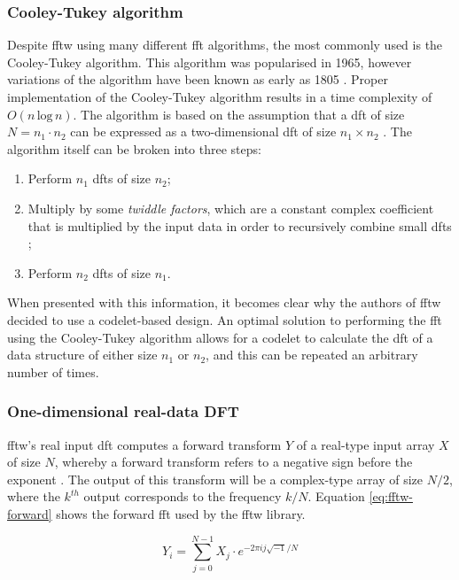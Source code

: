 \documentclass[a4paper,11pt]{report}
\begin{document}
\subsubsection{Cooley-Tukey algorithm}
Despite \gls{fftw} using many different \gls{fft} algorithms, the most commonly used is the Cooley-Tukey algorithm. This algorithm was popularised in 1965, however variations of the algorithm have been known as early as 1805 \cite{cooley1965algorithm, heideman1985gauss}. Proper implementation of the Cooley-Tukey algorithm results in a time complexity of $O(n\, \textrm{log}\, n)$. The algorithm is based on the assumption that a \gls{dft} of size $N = n_{1} \cdot n_{2}$ can be expressed as a two-dimensional \gls{dft} of size $n_{1} \times n_{2}$ \cite{frigo2005design}. The algorithm itself can be broken into three steps: 

\begin{enumerate}
	\item Perform $n_{1}$ \gls{dft}s of size $n_{2}$;
	\item Multiply by some \textit{twiddle factors}, which are a constant complex coefficient that is multiplied by the input data in order to recursively combine small \gls{dft}s \cite{gentleman1966fast};
	\item Perform $n_{2}$ \gls{dft}s of size $n_{1}$.
\end{enumerate}

When presented with this information, it becomes clear why the authors of \gls{fftw} decided to use a codelet-based design. An optimal solution to performing the \gls{fft} using the Cooley-Tukey algorithm allows for a codelet to calculate the \gls{dft} of a data structure of either size $n_{1}$ or $n_{2}$, and this can be repeated an arbitrary number of times.

\subsubsection{One-dimensional real-data DFT}
\gls{fftw}'s real input \gls{dft} computes a forward transform $Y$ of a real-type input array $X$ of size $N$, whereby a forward transform refers to a negative sign before the exponent \cite{frigo2005design}. The output of this transform will be a complex-type array of size $N/2$, where the $k^{th}$ output corresponds to the frequency $k/N$. Equation \ref{eq:fftw-forward} shows the forward \gls{fft} used by the \gls{fftw} library.

\begin{equation}
Y _ { i } = \sum _ { j = 0 } ^ { N - 1 } X _ { j } \cdot e ^ { - 2 \pi i j \sqrt { - 1 } / N }
\label{eq:fftw-forward}
\end{equation}
\end{document}
